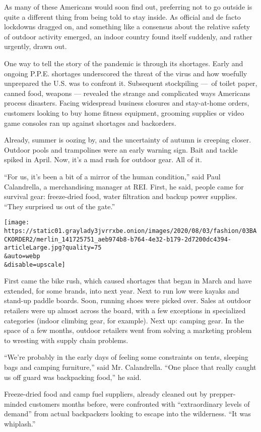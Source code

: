 As many of these Americans would soon find out, preferring not to go
outside is quite a different thing from being told to stay inside. As
official and de facto lockdowns dragged on, and something like a
consensus about the relative safety of outdoor activity emerged, an
indoor country found itself suddenly, and rather urgently, drawn out.

One way to tell the story of the pandemic is through its shortages.
Early and ongoing P.P.E. shortages underscored the threat of the virus
and how woefully unprepared the U.S. was to confront it. Subsequent
stockpiling ---~of toilet paper, canned food, weapons --- revealed the
strange and complicated ways Americans process disasters. Facing
widespread business closures and stay-at-home orders, customers looking
to buy home fitness equipment, grooming supplies or video game consoles
ran up against shortages and backorders.

Already, summer is oozing by, and the uncertainty of autumn is creeping
closer. Outdoor pools and trampolines were an early warning sign. Bait
and tackle spiked in April. Now, it's a mad rush for outdoor gear. All
of it.

``For us, it's been a bit of a mirror of the human condition,'' said
Paul Calandrella, a merchandising manager at REI. First, he said, people
came for survival gear: freeze-dried food, water filtration and backup
power supplies. ``They surprised us out of the gate.''

\texttt{[image: https://static01.graylady3jvrrxbe.onion/images/2020/08/03/fashion/03BACKORDER2/merlin\_141725751\_aeb974b8-b764-4e32-b179-2d7200dc4394-articleLarge.jpg?quality=75\\\&auto=webp\\\&disable=upscale]}

First came the bike rush, which caused shortages that began in March and
have extended, for some brands, into next year. Next to run low were
kayaks and stand-up paddle boards. Soon, running shoes were picked over.
Sales at outdoor retailers were up almost across the board, with a few
exceptions in specialized categories (indoor climbing gear, for
example). Next up: camping gear. In the space of a few months, outdoor
retailers went from solving a marketing problem to wresting with supply
chain problems.

``We're probably in the early days of feeling some constraints on tents,
sleeping bags and camping furniture,'' said Mr. Calandrella. ``One place
that really caught us off guard was backpacking food,'' he said.

Freeze-dried food and camp fuel suppliers, already cleaned out by
prepper-minded customers months before, were confronted with
``extraordinary levels of demand'' from actual backpackers looking to
escape into the wilderness. ``It was whiplash.''

